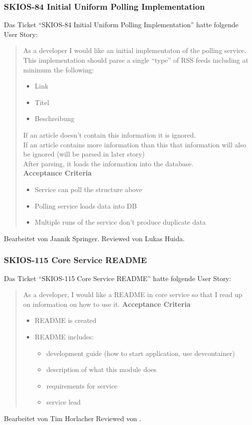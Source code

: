 \subsubsection{SKIOS-84 Initial Uniform Polling Implementation}
Das Ticket \enquote{SKIOS-84 Initial Uniform Polling Implementation} hatte folgende User Story:
\begin{quotation}
    As a developer I would like an initial implementaton of the polling service.\\
    This implementation should parse a single \enquote{type} of RSS feeds including at minimum the following:
    
    \begin{itemize}
        \item Link
        \item Titel
        \item Beschreibung
    \end{itemize}

    If an article doesn't contain this information it is ignored.\\
    If an article contains more information than this that information will also be ignored (will be parsed in later story)\\
    After parsing, it loads the information into the database. \\
\textbf{Acceptance Criteria}
\begin{itemize}
    \item Service can poll the structure above
    \item Polling service loads data into DB
    \item Multiple runs of the service don't produce duplicate data
\end{itemize}
\end{quotation}
Bearbeitet von Jannik Springer.
Reviewed von Lukas Huida.

\subsubsection{SKIOS-115 Core Service README}
Das Ticket \enquote{SKIOS-115 Core Service README} hatte folgende User Story:
\begin{quotation}
    As a developer, I would like a README in core service so that I read up on information on how to use it.
\textbf{Acceptance Criteria}
\begin{itemize}
    \item README is created
    \item README includes:
    \begin{itemize}
        \item development guide (how to start application, use devcontainer)
        \item description of what this module does
        \item requirements for service
        \item service lead
    \end{itemize}
\end{itemize}
\end{quotation}
Bearbeitet von Tim Horlacher
Reviewed von .

